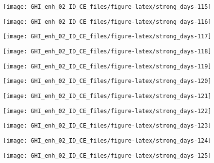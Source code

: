 \documentclass[
  10pt,
  a4paper,oneside]{article}
\begin{document}
\begin{center}\texttt{[image: GHI\_enh\_02\_ID\_CE\_files/figure-latex/strong\_days-115]} \end{center}

\begin{center}\texttt{[image: GHI\_enh\_02\_ID\_CE\_files/figure-latex/strong\_days-116]} \end{center}

\begin{center}\texttt{[image: GHI\_enh\_02\_ID\_CE\_files/figure-latex/strong\_days-117]} \end{center}

\begin{center}\texttt{[image: GHI\_enh\_02\_ID\_CE\_files/figure-latex/strong\_days-118]} \end{center}

\begin{center}\texttt{[image: GHI\_enh\_02\_ID\_CE\_files/figure-latex/strong\_days-119]} \end{center}

\begin{center}\texttt{[image: GHI\_enh\_02\_ID\_CE\_files/figure-latex/strong\_days-120]} \end{center}

\begin{center}\texttt{[image: GHI\_enh\_02\_ID\_CE\_files/figure-latex/strong\_days-121]} \end{center}

\begin{center}\texttt{[image: GHI\_enh\_02\_ID\_CE\_files/figure-latex/strong\_days-122]} \end{center}

\begin{center}\texttt{[image: GHI\_enh\_02\_ID\_CE\_files/figure-latex/strong\_days-123]} \end{center}

\begin{center}\texttt{[image: GHI\_enh\_02\_ID\_CE\_files/figure-latex/strong\_days-124]} \end{center}

\begin{center}\texttt{[image: GHI\_enh\_02\_ID\_CE\_files/figure-latex/strong\_days-125]} \end{center}
\end{document}
